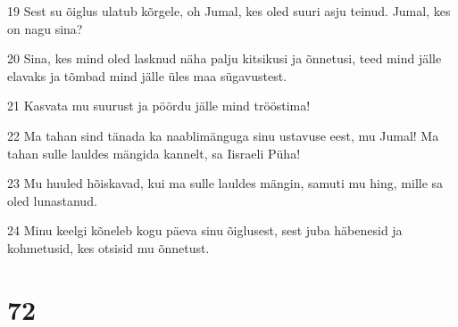 \par 19 Sest su õiglus ulatub kõrgele, oh Jumal, kes oled suuri asju teinud. Jumal, kes on nagu sina?
\par 20 Sina, kes mind oled lasknud näha palju kitsikusi ja õnnetusi, teed mind jälle elavaks ja tõmbad mind jälle üles maa sügavustest.
\par 21 Kasvata mu suurust ja pöördu jälle mind trööstima!
\par 22 Ma tahan sind tänada ka naablimänguga sinu ustavuse eest, mu Jumal! Ma tahan sulle lauldes mängida kannelt, sa Iisraeli Püha!
\par 23 Mu huuled hõiskavad, kui ma sulle lauldes mängin, samuti mu hing, mille sa oled lunastanud.
\par 24 Minu keelgi kõneleb kogu päeva sinu õiglusest, sest juba häbenesid ja kohmetusid, kes otsisid mu õnnetust.

\chapter{72}

